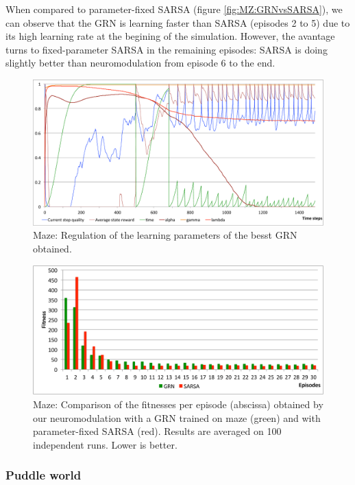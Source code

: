 When compared to parameter-fixed SARSA (figure \ref{fig:MZ:GRNvsSARSA}), we can observe that the GRN is learning faster than SARSA (episodes 2 to 5) due to its high learning rate at the begining of the simulation. However, the avantage turns to fixed-parameter SARSA in the remaining episodes: SARSA is doing slightly better than neuromodulation from episode 6 to the end.

\begin{figure}[h]
\center
\includegraphics[width=\linewidth]{MZ_GRNBehavior.pdf}
\caption{Maze: Regulation of the learning parameters of the besst GRN obtained.}\label{fig:MZ:GRNBehavior}
\end{figure}

\begin{figure}[h]
\center
\includegraphics[width=\linewidth]{MZ_GRNvsSARSA.pdf}
\caption{Maze: Comparison of the fitnesses per episode (abscissa) obtained by our neuromodulation with a GRN trained on maze (green) and with parameter-fixed SARSA (red). Results are averaged on 100 independent runs. Lower is better.}\label{fig:MC:GRNvsSARSA}
\end{figure}


\subsubsection{Puddle world}


